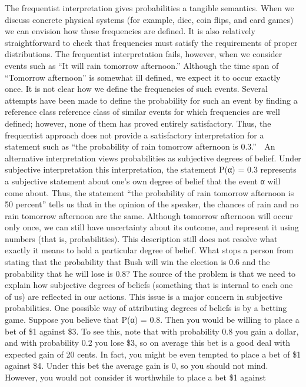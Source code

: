 The frequentist interpretation gives probabilities a tangible semantics. When we discuss concrete physical systems (for example, dice, coin flips, and card games) we can envision how these frequencies are defined. It is also relatively straightforward to check that frequencies must satisfy the requirements of proper distributions. The frequentist interpretation fails, however, when we consider events such as “It will rain tomorrow afternoon.” Although the time span of “Tomorrow afternoon” is somewhat ill defined, we expect it to occur exactly once. It is not clear how we define the frequencies of such events. Several attempts have been made to define the probability for such an event by finding a reference class reference class of similar events for which frequencies are well defined; however, none of them has proved entirely satisfactory. Thus, the frequentist approach does not provide a satisfactory interpretation for a statement such as “the probability of rain tomorrow afternoon is 0.3.”  An alternative interpretation views probabilities as subjective degrees of belief. Under subjective interpretation this interpretation, the statement P(α) = 0.3 represents a subjective statement about one’s own degree of belief that the event α will come about. Thus, the statement “the probability of rain tomorrow afternoon is 50 percent” tells us that in the opinion of the speaker, the chances of rain and no rain tomorrow afternoon are the same. Although tomorrow afternoon will occur only once, we can still have uncertainty about its outcome, and represent it using numbers (that is, probabilities). This description still does not resolve what exactly it means to hold a particular degree of belief. What stops a person from stating that the probability that Bush will win the election is 0.6 and the probability that he will lose is 0.8? The source of the problem is that we need to explain how subjective degrees of beliefs (something that is internal to each one of us) are reflected in our actions. This issue is a major concern in subjective probabilities. One possible way of attributing degrees of beliefs is by a betting game. Suppose you believe that P(α) = 0.8. Then you would be willing to place a bet of \$1 against \$3. To see this, note that with probability 0.8 you gain a dollar, and with probability 0.2 you lose \$3, so on average this bet is a good deal with expected gain of 20 cents. In fact, you might be even tempted to place a bet of \$1 against \$4. Under this bet the average gain is 0, so you should not mind. However, you would not consider it worthwhile to place a bet \$1 against

